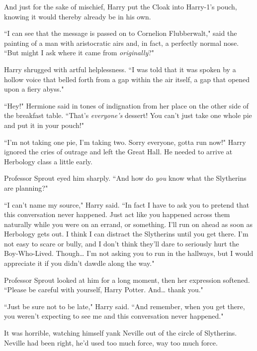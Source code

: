 And just for the sake of mischief, Harry put the Cloak into Harry-1's pouch, knowing it would thereby already be in his own.

\later

``I can see that the message is passed on to Cornelion Flubberwalt," said the painting of a man with aristocratic airs and, in fact, a perfectly normal nose. ``But might I ask where it came from \emph{originally}?"

Harry shrugged with artful helplessness. ``I was told that it was spoken by a hollow voice that belled forth from a gap within the air itself, a gap that opened upon a fiery abyss."

\later

``Hey!" Hermione said in tones of indignation from her place on the other side of the breakfast table. ``That's \emph{everyone's} dessert! You can't just take one whole pie and put it in your pouch!"

``I'm not taking one pie, I'm taking two. Sorry everyone, gotta run now!" Harry ignored the cries of outrage and left the Great Hall. He needed to arrive at Herbology class a little early.

\later

Professor Sprout eyed him sharply. ``And how do \emph{you} know what the Slytherins are planning?"

``I can't name my source," Harry said. ``In fact I have to ask you to pretend that this conversation never happened. Just act like you happened across them naturally while you were on an errand, or something. I'll run on ahead as soon as Herbology gets out. I think I can distract the Slytherins until you get there. I'm not easy to scare or bully, and I don't think they'll dare to seriously hurt the Boy-Who-Lived. Though{\ldots} I'm not asking you to run in the hallways, but I would appreciate it if you didn't dawdle along the way."

Professor Sprout looked at him for a long moment, then her expression softened. ``Please be careful with yourself, Harry Potter. And{\ldots} thank you."

``Just be sure not to be late," Harry said. ``And remember, when you get there, you weren't expecting to see me and this conversation never happened."

\later

It was horrible, watching himself yank Neville out of the circle of Slytherins. Neville had been right, he'd used too much force, way too much force.

